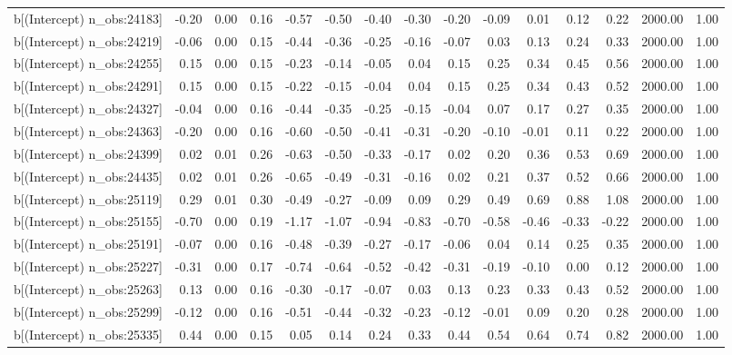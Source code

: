 \begin{table}[ht]
\begin{tabular}{rrrrrrrrrrrrrrr}
  b[(Intercept) n\_obs:24183] & -0.20 & 0.00 & 0.16 & -0.57 & -0.50 & -0.40 & -0.30 & -0.20 & -0.09 & 0.01 & 0.12 & 0.22 & 2000.00 & 1.00 \\ 
  b[(Intercept) n\_obs:24219] & -0.06 & 0.00 & 0.15 & -0.44 & -0.36 & -0.25 & -0.16 & -0.07 & 0.03 & 0.13 & 0.24 & 0.33 & 2000.00 & 1.00 \\ 
  b[(Intercept) n\_obs:24255] & 0.15 & 0.00 & 0.15 & -0.23 & -0.14 & -0.05 & 0.04 & 0.15 & 0.25 & 0.34 & 0.45 & 0.56 & 2000.00 & 1.00 \\ 
  b[(Intercept) n\_obs:24291] & 0.15 & 0.00 & 0.15 & -0.22 & -0.15 & -0.04 & 0.04 & 0.15 & 0.25 & 0.34 & 0.43 & 0.52 & 2000.00 & 1.00 \\ 
  b[(Intercept) n\_obs:24327] & -0.04 & 0.00 & 0.16 & -0.44 & -0.35 & -0.25 & -0.15 & -0.04 & 0.07 & 0.17 & 0.27 & 0.35 & 2000.00 & 1.00 \\ 
  b[(Intercept) n\_obs:24363] & -0.20 & 0.00 & 0.16 & -0.60 & -0.50 & -0.41 & -0.31 & -0.20 & -0.10 & -0.01 & 0.11 & 0.22 & 2000.00 & 1.00 \\ 
  b[(Intercept) n\_obs:24399] & 0.02 & 0.01 & 0.26 & -0.63 & -0.50 & -0.33 & -0.17 & 0.02 & 0.20 & 0.36 & 0.53 & 0.69 & 2000.00 & 1.00 \\ 
  b[(Intercept) n\_obs:24435] & 0.02 & 0.01 & 0.26 & -0.65 & -0.49 & -0.31 & -0.16 & 0.02 & 0.21 & 0.37 & 0.52 & 0.66 & 2000.00 & 1.00 \\ 
  b[(Intercept) n\_obs:25119] & 0.29 & 0.01 & 0.30 & -0.49 & -0.27 & -0.09 & 0.09 & 0.29 & 0.49 & 0.69 & 0.88 & 1.08 & 2000.00 & 1.00 \\ 
  b[(Intercept) n\_obs:25155] & -0.70 & 0.00 & 0.19 & -1.17 & -1.07 & -0.94 & -0.83 & -0.70 & -0.58 & -0.46 & -0.33 & -0.22 & 2000.00 & 1.00 \\ 
  b[(Intercept) n\_obs:25191] & -0.07 & 0.00 & 0.16 & -0.48 & -0.39 & -0.27 & -0.17 & -0.06 & 0.04 & 0.14 & 0.25 & 0.35 & 2000.00 & 1.00 \\ 
  b[(Intercept) n\_obs:25227] & -0.31 & 0.00 & 0.17 & -0.74 & -0.64 & -0.52 & -0.42 & -0.31 & -0.19 & -0.10 & 0.00 & 0.12 & 2000.00 & 1.00 \\ 
  b[(Intercept) n\_obs:25263] & 0.13 & 0.00 & 0.16 & -0.30 & -0.17 & -0.07 & 0.03 & 0.13 & 0.23 & 0.33 & 0.43 & 0.52 & 2000.00 & 1.00 \\ 
  b[(Intercept) n\_obs:25299] & -0.12 & 0.00 & 0.16 & -0.51 & -0.44 & -0.32 & -0.23 & -0.12 & -0.01 & 0.09 & 0.20 & 0.28 & 2000.00 & 1.00 \\ 
  b[(Intercept) n\_obs:25335] & 0.44 & 0.00 & 0.15 & 0.05 & 0.14 & 0.24 & 0.33 & 0.44 & 0.54 & 0.64 & 0.74 & 0.82 & 2000.00 & 1.00 \\ 

\end{tabular}
\end{table}
